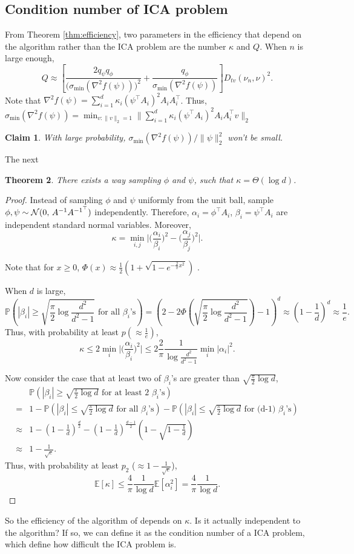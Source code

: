 \documentclass[english]{article} %
\newcommand{\cN}{\cal{N}}
\newcommand{\E}{\mathbb{E}}
\newcommand{\Prob}[1]{\mathbb{P}\left(#1\right)}
\providecommand{\theoremname}{Theorem}
\providecommand{\claimname}{Claim}
\theoremstyle{plain}
\newtheorem{thm}{\protect\theoremname}
\newtheorem{claim}[thm]{\protect\claimname}
\theoremstyle{definition}
\theoremstyle{remark}
\begin{document}
\subsection{Condition number of ICA problem}
From Theorem \ref{thm:efficiency}, two parameters in the efficiency that depend on the algorithm rather than the ICA problem are the number $\kappa$ and $Q$. 
When $n$ is large enough, 
\[
Q\approx \left[ \frac{2q_{\psi}q_{\phi}}{\big(\sigma_{\min}(\nabla^2f(\psi))\big)^2}+\frac{q_{\phi}}{\sigma_{\min}(\nabla^2f(\psi))}\right]D_{tv}(\nu_n , \nu)^2.
\] 
Note that $\nabla^2f(\psi) = \sum_{i=1}^{d} \kappa_i(\psi^{\top}A_i)^2A_iA_i^{\top}$. Thus, $\sigma_{\min}(\nabla^2f(\psi)) = \min_{v:\|v\|_2=1}\|\sum_{i=1}^{d} \kappa_i(\psi^{\top}A_i)^2A_iA_i^{\top}v\|_2$ 

\begin{claim}
With large probability, $\sigma_{\min}(\nabla^2f(\psi))/\|\psi\|_2^2$ won't be small.
\end{claim}

The next
\begin{thm}
There exists a way sampling $\phi$ and $\psi$, such that $\kappa = \Theta(\log d)$.
\end{thm}
\begin{proof}
Instead of sampling $\phi$ and $\psi$ uniformly from the unit ball, sample $\phi,\psi \sim {\cN} (0,\,A^{-1}A^{{-1}^{\top}})$ independently. Therefore, $\alpha_i = \phi^{\top}A_i$, $\beta_i = \psi^{\top}A_i$ are independent standard normal variables. Moreover, 
\[
\kappa  = \min_{i,j} \vert \big(\frac{\alpha_i}{\beta_i}\big)^2 - \big(\frac{\alpha_j}{\beta_j}\big)^2 \vert.
\] 

Note that for $x\ge0$, $\Phi(x) \approx \frac12 (1+\sqrt{1-e^{-\frac{2}{\pi}x^2}})$ \citep{aludaat2008note}.
 
 When $d$ is large,
\[
\Prob{|\beta_i| \ge \sqrt{\frac{\pi}{2}\log \frac{d^2}{d^2-1}} \text{ for all } \beta_i\text{'s}} = (2- 2\Phi(\sqrt{\frac{\pi}{2}\log \frac{d^2}{d^2-1}})-1)^d \approx \left(1-\frac{1}{d}\right)^d \approx \frac{1}{e}.
\]
Thus, with probability at least $p (\approx \frac{1}{e})$,
\[
\kappa \le 2 \min_i \vert \big(\frac{\alpha_i}{\beta_i}\big)^2\vert \le 2 \frac{2}{\pi}\frac{1}{\log \frac{d^2}{d^2-1}}\min_i |\alpha_i|^2.
\]

Now consider the case that at least two of $\beta_i$'s are greater than $\sqrt{\frac{\pi}{2}\log d}$,
\begin{align*}
& \Prob{|\beta_i| \ge \sqrt{\frac{\pi}{2}\log d} \text{ for at least 2 } \beta_i\text{'s}} \\
=  & 1 - \Prob{|\beta_i| \le \sqrt{\frac{\pi}{2}\log d} \text{ for all } \beta_i\text{'s}} - \Prob{|\beta_i| \le \sqrt{\frac{\pi}{2}\log d} \text{ for (d-1) } \beta_i\text{'s}} \\
\approx & 1 - (1-\frac{1}{d})^{\frac{d}{2}} -  (1-\frac{1}{d})^{\frac{d-1}{2}}(1-\sqrt{1-\frac{1}{d}}) \\
\approx & 1 -\frac{1}{\sqrt{e}}.
\end{align*}
Thus, with probability at least $p_2$ ($\approx 1-\frac{1}{\sqrt{e}}$),
\[
\E[\kappa] \le \frac{4}{\pi} \frac{1}{\log d} \E[\alpha_i^2] = \frac{4}{\pi} \frac{1}{\log d}.
\]
\end{proof}

So the efficiency of the algorithm of \citet{DHsu2012} depends on $\kappa$. Is it actually independent to the algorithm? If so, we can define it as the condition number of a ICA problem, which define how difficult the ICA problem is. 



\end{document}
